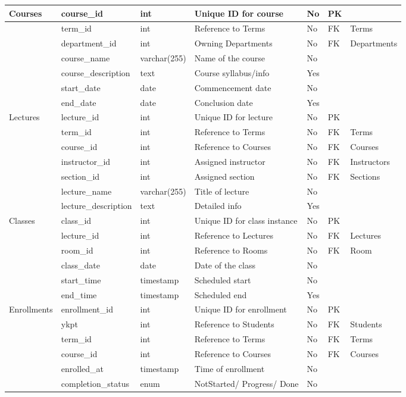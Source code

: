 \documentclass[12pt,a4paper]{report}
\begin{document}
\begin{xltabular}{\textwidth}{|L|L|L|Y|L|L|L|}
    Courses & course\_id & int & Unique ID for course & No & PK & \\ \hline
    	 & term\_id & int & Reference to Terms & No & FK & Terms \\ \hline
     & department\_id & int & Owning Departments & No & FK & Departments \\ \hline
     & course\_name & varchar(255) & Name of the course & No & & \\ \hline
     & course\_description & text & Course syllabus/info & Yes & & \\ \hline
     & start\_date & date & Commencement date & No & & \\ \hline
     & end\_date & date & Conclusion date & Yes & & \\ \hline

    Lectures & lecture\_id & int & Unique ID for lecture & No & PK & \\ \hline
     & term\_id & int & Reference to Terms & No & FK & Terms \\ \hline
     & course\_id & int & Reference to Courses & No & FK & Courses \\ \hline
     & instructor\_id & int & Assigned instructor & No & FK & Instructors \\ \hline
     & section\_id & int & Assigned section & No & FK & Sections \\ \hline
     & lecture\_name & varchar(255) & Title of lecture & No & & \\ \hline
     & lecture\_description & text & Detailed info & Yes & & \\ \hline

    Classes & class\_id & int & Unique ID for class instance & No & PK & \\ \hline
     & lecture\_id & int & Reference to Lectures & No & FK & Lectures \\ \hline
     & room\_id & int & Reference to Rooms & No & FK & Room \\ \hline
     & class\_date & date & Date of the class & No & & \\ \hline
     & start\_time & timestamp & Scheduled start & No & & \\ \hline
     & end\_time & timestamp & Scheduled end & Yes & & \\ \hline

    Enrollments & enrollment\_id & int & Unique ID for enrollment & No & PK & \\ \hline
     & ykpt & int & Reference to Students & No & FK & Students \\ \hline
     & term\_id & int & Reference to Terms & No & FK & Terms \\ \hline
     & course\_id & int & Reference to Courses & No & FK & Courses \\ \hline
     & enrolled\_at & timestamp & Time of enrollment & No & & \\ \hline
     & completion\_status & enum & NotStarted/ Progress/ Done & No & & \\ \hline


\end{xltabular}
\end{document}
